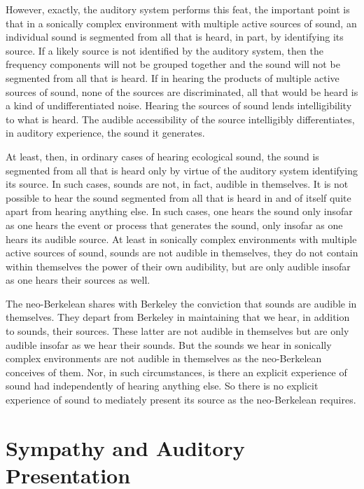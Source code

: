 However, exactly, the auditory system performs this feat, the important point is that in a sonically complex environment with multiple active sources of sound, an individual sound is segmented from all that is heard, in part, by identifying its source. If a likely source is not identified by the auditory system, then the frequency components will not be grouped together and the sound will not be segmented from all that is heard. If in hearing the products of multiple active sources of sound, none of the sources are discriminated, all that would be heard is a kind of undifferentiated noise. Hearing the sources of sound lends intelligibility to what is heard. The audible accessibility of the source intelligibly differentiates, in auditory experience, the sound it generates.

At least, then, in ordinary cases of hearing ecological sound, the sound is segmented from all that is heard only by virtue of the auditory system identifying its source. In such cases, sounds are not, in fact, audible in themselves. It is not possible to hear the sound segmented from all that is heard in and of itself quite apart from hearing anything else. In such cases, one hears the sound only insofar as one hears the event or process that generates the sound, only insofar as one hears its audible source. At least in sonically complex environments with multiple active sources of sound, sounds are not audible in themselves, they do not contain within themselves the power of their own audibility, but are only audible insofar as one hears their sources as well. 

The neo-Berkelean shares with Berkeley the conviction that sounds are audible in themselves. They depart from Berkeley in maintaining that we hear, in addition to sounds, their sources. These latter are not audible in themselves but are only audible insofar as we hear their sounds. But the sounds we hear in sonically complex environments are not audible in themselves as the neo-Berkelean conceives of them. Nor, in such circumstances, is there an explicit experience of sound had independently of hearing anything else. So there is no explicit experience of sound to mediately present its source as the neo-Berkelean requires.


\section{Sympathy and Auditory Presentation} %
\label{sec:sympathy_and_auditory_presentation}


